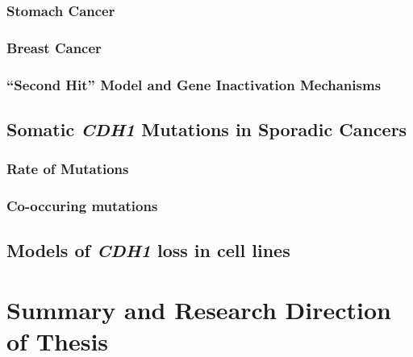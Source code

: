 \subsubsection{Stomach Cancer}
\subsubsection{Breast Cancer}
\subsubsection{``Second Hit'' Model and Gene Inactivation Mechanisms}

\subsection{Somatic \textit{CDH1} Mutations in Sporadic Cancers}
\subsubsection{Rate of Mutations}
\subsubsection{Co-occuring mutations}

\subsection{Models of \textit{CDH1} loss in cell lines}



\section{Summary and Research Direction of Thesis}


